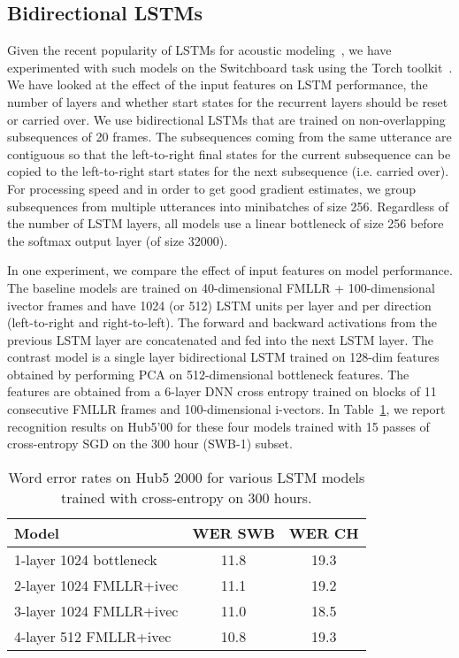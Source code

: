 \documentclass[a4paper]{article}
\begin{document}
\subsection{Bidirectional LSTMs}

Given the recent popularity of LSTMs for acoustic
modeling~\cite{hannun14, sak15, miao15, mohamed15}, we have
experimented with such models on the Switchboard task using the Torch toolkit~\cite{collobert11}. We have looked
at the effect of the input features on LSTM performance, the number of
layers and whether start states for the recurrent layers should be
reset or carried over. We use bidirectional LSTMs that are trained
on non-overlapping subsequences of 20 frames. The subsequences coming from the same
utterance are contiguous so that the left-to-right final states for the current
subsequence can be copied to the left-to-right start states for the next
subsequence (i.e. carried over). For processing speed and in order to
get good gradient estimates, we group subsequences from multiple
utterances into minibatches of size 256. Regardless of the number of
LSTM layers, all models use a linear bottleneck of size 256 before the
softmax output layer (of size 32000).

In one experiment, we compare the effect of input features on
model performance. The baseline models are trained on 40-dimensional
FMLLR + 100-dimensional ivector frames and have 1024 (or 512) LSTM units per
layer and per direction (left-to-right and right-to-left). The forward
and backward activations from the previous LSTM layer
are concatenated and fed into the next LSTM layer.  The contrast model
is a single layer bidirectional LSTM trained on 128-dim features obtained
by performing PCA on 512-dimensional bottleneck features. The features are obtained from a 6-layer
DNN cross entropy trained on blocks of 11 consecutive FMLLR frames and 100-dimensional
i-vectors. In Table~\ref{lstm1}, we report recognition results on
Hub5'00 for these four models trained with 15 passes of cross-entropy SGD on the 300
hour (SWB-1) subset.

\begin{table}[htpb!]
\begin{center}
\begin{tabular}{|l|c|c|} \hline
     Model               & WER SWB & WER CH      \\ \hline
1-layer 1024 bottleneck  & 11.8 & 19.3 \\ \hline
2-layer 1024 FMLLR+ivec  & 11.1 & 19.2 \\ \hline
3-layer 1024 FMLLR+ivec  & 11.0 & 18.5 \\ \hline
4-layer 512 FMLLR+ivec   & 10.8 & 19.3 \\ \hline
\end{tabular}
\end{center}
\caption{\label{lstm1}
Word error rates on Hub5 2000 for various LSTM models trained with cross-entropy on 300 hours.}
\end{table}
\end{document}
